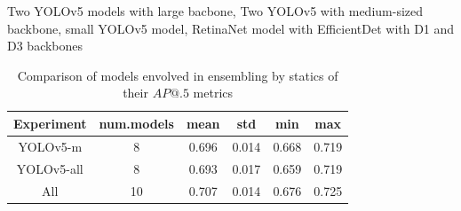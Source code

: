 Two YOLOv5 models with large bacbone, Two YOLOv5 with medium-sized backbone, small YOLOv5 model, RetinaNet model with  EfficientDet with D1 and D3 backbones


\begin{table}[h]
    \centering
    \begin{tabular}{|c|c|c|c|c|c|}
        \hline
        Experiment & num.models & mean  & std   & min   & max   \\ \hline
        YOLOv5-m   & 8          & 0.696 & 0.014 & 0.668 & 0.719 \\ \hline
        YOLOv5-all & 8          & 0.693 & 0.017 & 0.659 & 0.719 \\ \hline
        All        & 10         & 0.707 & 0.014 & 0.676 & 0.725 \\ \hline
    \end{tabular}
    \caption{Comparison of models envolved in ensembling by statics of their $AP@.5$ metrics}
    \label{tab:ensemlbe_models_involved}
\end{table}